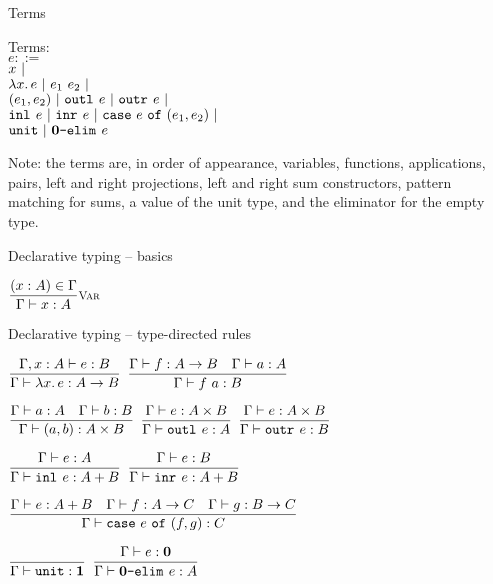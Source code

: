 \documentclass{beamer}
\begin{document}
\begin{frame}{Terms}

Terms: \\
$e ::=$ \\
\qquad $x \ |\ $ \\
\qquad $\fun{x}{e} \pipe \app{e_1}{e_2} \pipe$ \\
\qquad $(e_1, e_2) \ |\  \texttt{outl}_{}\ e \ |\  \texttt{outr}_{}\ e \ |\ $ \\
\qquad $\texttt{inl}_{}\ e \ |\  \texttt{inr}_{}\ e \ |\  \texttt{case}\ e\ \texttt{of}\ (e_1, e_2) \ |\ $ \\
\qquad $\texttt{unit} \ |\  \textbf{0}\texttt{-elim}_{}\ e$

\vspace{2em}

Note: the terms are, in order of appearance, variables, functions, applications, pairs, left and right projections, left and right sum constructors, pattern matching for sums, a value of the unit type, and the eliminator for the empty type.

\end{frame}

\begin{frame}{Declarative typing -- basics}

\begin{center}
  $\infrule[Var]{\sidecond{(x : A) \in \Gamma}}{\typing{x}{A}}$
\end{center}

\end{frame}

\begin{frame}{Declarative typing -- type-directed rules}

\begin{center}
  $\infrule{\typing[\extend{\Gamma}{x}{A}]{e}{B}}{\typing{\fun{x}{e}}{\Fun{A}{B}}}$ \quad
  $\infrule{\typing{f}{\Fun{A}{B}} \quad \typing{a}{A}}{\typing{\app{f}{a}}{B}}$

  \vspace{2em}

  $\infrule{\typing{a}{A} \quad \typing{b}{B}}{\typing{\pair{a}{b}}{\Prod{A}{B}}}$ \quad
  $\infrule{\typing{e}{\Prod{A}{B}}}{\typing{\outl{e}}{A}}$ \quad
  $\infrule{\typing{e}{\Prod{A}{B}}}{\typing{\outr{e}}{B}}$

  \vspace{2em}

  $\infrule{\typing{e}{A}}{\typing{\inl{e}}{\Sum{A}{B}}}$ \quad
  $\infrule{\typing{e}{B}}{\typing{\inr{e}}{\Sum{A}{B}}}$

  \vspace{2em}

  $\infrule{\typing{e}{\Sum{A}{B}} \quad \typing{f}{\Fun{A}{C}} \quad \typing{g}{\Fun{B}{C}}}{\typing{\case{e}{f}{g}}{C}}$

  \vspace{2em}

  $\infrule{}{\typing{\unit}{\Unit}}$ \quad
  $\infrule{\typing{e}{\Empty}}{\typing{\emptyelim{e}}{A}}$
\end{center}

\end{frame}
\end{document}
